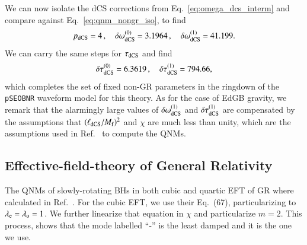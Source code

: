 \documentclass[twocolumn,
               prd,
               aps,
               superscriptaddress,
               tightenlines,
               nofootinbib,
               eqsecnum,
               amsfonts,
               amsmath,
               longbibliography]{revtex4-1}
\newcommand{\pSEOB}{\texttt{pSEOBNR}}
\newcommand{\lame}{\lambda_{\rm e}}
\newcommand{\lamo}{\lambda_{\rm o}}
\begin{document}
We can now isolate the dCS corrections from Eq.~\eqref{eq:omega_dcs_interm} and
compare against Eq.~\eqref{eq:qnm_nongr_iso}, to find
%
\begin{equation}
p_{\rm dCS} = 4\,, \quad \delta \omega^{(0)}_{\rm dCS} = 3.1964\,, \quad \delta \omega^{(1)}_{\rm dCS} = 41.199.
\label{eq:cs_omega_coefs}
\end{equation}
%
We can carry the same steps for $\tau_{\rm dCS}$ and find
%
\begin{equation}
\delta \tau^{(0)}_{\rm dCS} = 6.3619\,, \quad \delta \tau^{(1)}_{\rm dCS} = 794.66,
\label{eq:cs_tau_coefs}
\end{equation}
%
which completes the set of fixed non-GR parameters in the ringdown of the \pSEOB{} waveform model for this theory.
%
As for the case of EdGB gravity, we remark that the alarmingly large values of
$\delta \omega_{\rm dCS}^{(1)}$ and $\delta \tau_{\rm dCS}^{(1)}$ are
compensated by the assumptions that $(\ell_{\rm dCS} / M_{\rm f})^2$ and $\chi$
are much less than unity, which are the assumptions used in Ref.~\cite{Wagle:2021tam}
to compute the QNMs.

\subsection{Effective-field-theory of General Relativity}
\label{app:map_eftofgr}

The QNMs of slowly-rotating BHs in both cubic and quartic EFT of GR where calculated in Ref.~\cite{Cano:2021myl}.
%
For the cubic EFT, we use their Eq.~(67), particularizing to $\lame = \lamo = 1$. We further linearize that equation in
$\chi$ and particularize $m=2$.
%
This process, shows that the mode labelled ``-'' is the least damped and it is the one we use.


\end{document}

